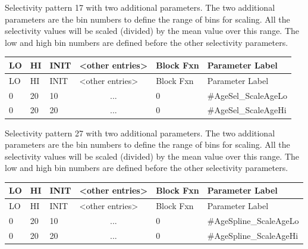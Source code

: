 \hypertarget{RandomWalkScaling}{}
Selectivity pattern 17 with two additional parameters. The two additional parameters are the bin numbers to define the range of bins for scaling. All the selectivity values will be scaled (divided) by the mean value over this range. The low and high bin numbers are defined before the other selectivity parameters.

	\begin{longtable}{p{1cm} p{1cm} p{1cm} p{2.9cm} p{1.9cm} p{4.2cm}}
		\hline
		LO \Tstrut & HI & INIT & <other entries> & Block Fxn & Parameter Label \Bstrut\\
		\hline
		\endfirsthead
	
		\hline
		LO \Tstrut & HI & INIT & <other entries> & Block Fxn & Parameter Label \Bstrut\\
		\hline
		\endhead

		0 & 20 & 10 & \multicolumn{1}{c}{...} & 0 & \#AgeSel\_ScaleAgeLo \Tstrut\\
		0 & 20 & 20 & \multicolumn{1}{c}{...} & 0 & \#AgeSel\_ScaleAgeHi \Bstrut\\
		\hline
	\end{longtable}

\hypertarget{CubicSplineScaling}{}
Selectivity pattern 27 with two additional parameters. The two additional parameters are the bin numbers to define the range of bins for scaling. All the selectivity values will be scaled (divided) by the mean value over this range. The low and high bin numbers are defined before the other selectivity parameters.

	\begin{longtable}{p{1cm} p{1cm} p{1cm} p{2.9cm} p{1.9cm} p{4.2cm}}
		\hline
		LO \Tstrut & HI & INIT & <other entries> & Block Fxn & Parameter Label \Bstrut\\
		\hline
		\endfirsthead
	
		\hline
		LO \Tstrut & HI & INIT & <other entries> & Block Fxn & Parameter Label \Bstrut\\
		\hline
		\endhead

		0 & 20 & 10 & \multicolumn{1}{c}{...} & 0 & \#AgeSpline\_ScaleAgeLo \Tstrut\\
		0 & 20 & 20 & \multicolumn{1}{c}{...} & 0 & \#AgeSpline\_ScaleAgeHi \Bstrut\\
		\hline
	\end{longtable}

